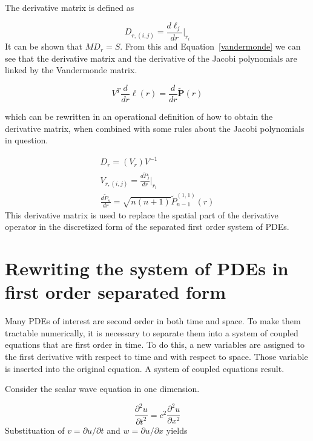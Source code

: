 \documentclass{article}
\begin{document}
The derivative matrix is defined as 

\begin{equation}
D_{r,(i,j)}=\frac{d\ell_j}{dr}\biggr\rvert_{r_i}
\end{equation}
It can be shown that $MD_r=S$. From this and
Equation~\ref{vandermonde} we can see that the derivative matrix and
the derivative of the Jacobi polynomials are linked by the Vandermonde
matrix.

\begin{equation}
V^T\frac{d}{dr}\boldsymbol{\ell}(r)=\frac{d}{dr}\boldsymbol{\widetilde{P}}(r)
\end{equation}

which can be rewritten in an operational definition of how to obtain
the derivative matrix, when combined with some rules about the Jacobi
polynomials in question.

\begin{eqnarray}
D_r=(V_r)V^{-1}\\
V_{r,(i,j)}=\frac{d\widetilde{P}_j}{dr}\biggr\rvert_{r_i}\\
\frac{d\widetilde{P}_n}{dr}=\sqrt{n(n+1)}\widetilde{P}_{n-1}^{(1,1)}(r)
\end{eqnarray}
This derivative matrix is used to replace the spatial part of the
derivative operator in the discretized form of the separated first
order system of PDEs.


\section{Rewriting the system of PDEs in first order separated form}

Many PDEs of interest are second order in both time and space. To make
them tractable numerically, it is necessary to separate them into a
system of coupled equations that are first order in time. To do this,
a new variables are assigned to the first derivative with respect to
time and with respect to space. Those variable is inserted
into the original equation. A system of coupled equations result. 

Consider the scalar wave equation in one dimension. 

\begin{equation}
\frac{\partial^2 u}{\partial t^2}=c^2\frac{\partial^2 u}{\partial x^2}
\label{waveeqn}
\end{equation}
Substituation of $v=\partial u/\partial t$ and $w=\partial u/\partial x$ yields
\end{document}

